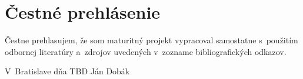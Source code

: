 \chapter*{Čestné prehlásenie}

Čestne prehlasujem, že som maturitný projekt vypracoval samostatne
s~použitím odbornej literatúry a~zdrojov uvedených v~zozname
bibliografických odkazov.

\vspace{2cm}
\noindent
V~Bratislave dňa TBD \hfill Ján Dobák
